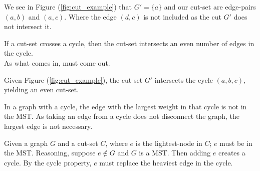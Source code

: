 \noindent
We see in Figure (\ref{fig:cut_example}) that $G'=\{a\}$ and our cut-set are edge-pairs $(a,b)$ and $(a,c)$. Where the edge $(d,c)$ is not included as the cut $G'$ does not intersect it.
\begin{theo}

    If a cut-set crosses a cycle, then the cut-set intersects an even number of edges in the cycle.\\
    As what comes in, must come out.
\end{theo}
\noindent
Given Figure (\ref{fig:cut_example}), the cut-set $G'$ intersects the cycle $(a,b,c)$, yielding an even cut-set.
\begin{theo}
    
    In a graph with a cycle, the edge with the largest weight in that cycle is not in the MST.
    As taking an edge from a cycle does not disconnect the graph, the largest edge is not necessary.
\end{theo}
\begin{theo}

    Given a graph $G$ and a cut-set $C$, where $e$ is the lightest-node in $C$; $e$ must be in the MST. Reasoning, suppose $e\notin G$ and $G$ is a MST. Then adding $e$ creates a cycle. By the cycle property, $e$ must replace the heaviest edge in the cycle.
\end{theo}


